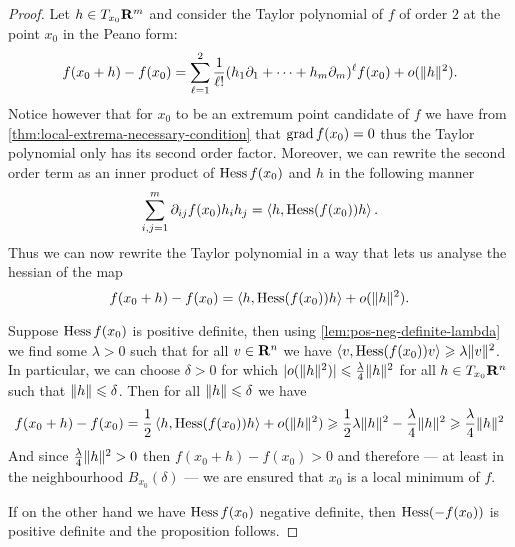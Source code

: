 \begin{proof}
    Let \(h \in T_{x_0}\mathbf{R}^m\) and consider the Taylor polynomial of \(f\) of order
    \(2\) at the point \(x_0\) in the Peano form:
    \[
        f(x_0 + h) - f(x_0) = \sum_{\ell=1}^2 \frac{1}{\ell!} (h_1 \partial_1 + \dots + h_m \partial_m)^{\ell}
        f(x_0) + o(\lVert h\rVert^2).
    \]
    Notice however that for \(x_0\) to be an extremum point candidate of \(f\) we
    have from \cref{thm:local-extrema-necessary-condition} that \(\operatorname{grad} f(x_0) =
    0\) thus the Taylor polynomial only has its second order factor. Moreover, we
    can rewrite the second order term as an inner product of \(\operatorname{Hess} f(x_0)\) and
    \(h\) in the following manner
    \[
        \sum_{i, j = 1}^m \partial_{ij} f(x_0) h_i h_j
        = \left\langle h, \operatorname{Hess}(f(x_0)) h \right\rangle.
    \]
    Thus we can now rewrite the Taylor polynomial in a way that lets us analyse
    the hessian of the map
    \[
        f(x_0 + h) - f(x_0) = \left\langle h, \operatorname{Hess}(f(x_0)) h \right\rangle + o(\lVert h\rVert^2).
    \]

    Suppose \(\operatorname{Hess} f(x_0)\) is positive definite, then using
    \cref{lem:pos-neg-definite-lambda} we find some \(\lambda > 0\) such that for all
    \(v \in \mathbf{R}^n\) we have \(\left\langle v, \operatorname{Hess}(f(x_0)) v \right\rangle \geqslant \lambda \lVert v\rVert^2\). In
    particular, we can choose \(\delta > 0\) for which \(|o(\lVert h\rVert^2)| \leqslant \frac{\lambda}{4}
    \lVert h\rVert^2\) for all \(h \in T_{x_0}\mathbf{R}^n\) such that \(\lVert h\rVert \leqslant \delta\). Then for
    all \(\lVert h\rVert \leqslant \delta\) we have
    \begin{align*}
        f(x_0 + h) - f(x_0)
        = \frac{1}{2} \left\langle h, \operatorname{Hess}(f(x_0)) h \right\rangle + o(\lVert h\rVert^2)
        \geqslant \frac{1}{2} \lambda \lVert h\rVert^2 - \frac{\lambda}{4} \lVert h\rVert^2
        \geqslant \frac{\lambda}{4} \lVert h\rVert^2
    \end{align*}
    And since \(\frac{\lambda}{4} \lVert h\rVert^2 > 0\) then \(f(x_{0} + h) - f(x_0) > 0\)
    and therefore --- at least in the neighbourhood \(B_{x_0}(\delta)\) --- we are ensured
    that \(x_0\) is a local minimum of \(f\).

    If on the other hand we have \(\operatorname{Hess} f(x_0)\) negative definite, then
    \(\operatorname{Hess}(-f(x_0))\) is positive definite and the proposition follows.


\end{proof}
